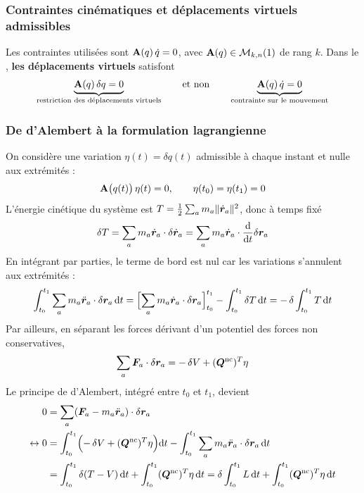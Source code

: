 \subsubsection{Contraintes cinématiques et déplacements virtuels admissibles}

Les contraintes utilisées sont $\mathbf{A}(q)\,\dot q = 0$, avec
$\mathbf{A}(q)\in\mathcal{M}_{k,n}(1)$ de rang $k$. Dans le , \textbf{les déplacements virtuels} satisfont
\[
    \underbrace{\mathbf{A}(q)\,\delta q = 0}
    _{\text{restriction des déplacements virtuels}}
    \qquad\text{et non}\qquad
    \underbrace{\mathbf{A}(q)\,\dot q = 0}
    _{\text{contrainte sur le mouvement}}
\]

\subsubsection{De d'Alembert à la formulation lagrangienne}

On considère une variation $\eta(t) = \delta q(t)$ admissible à chaque
instant et nulle aux extrémités :
\[
    \mathbf{A}\bigl(q(t)\bigr)\,\eta(t) = 0,
    \qquad \eta(t_0) = \eta(t_1) = 0
\]
L'énergie cinétique du système est $T = \frac12\sum_a m_a
\|\dot{\bm{r}}_a\|^2$, donc à temps fixé
\[
    \delta T = \sum_a m_a\dot{\bm{r}}_a\cdot\delta\dot{\bm{r}}_a
    = \sum_a m_a\dot{\bm{r}}_a\cdot\frac{\mathrm{d}}{\mathrm{d} t}\delta\bm{r}_a
\]
En intégrant par parties, le terme de bord est nul car les variations
s'annulent aux extrémités :
\[
    \int_{t_0}^{t_1}\sum_a m_a\ddot{\bm{r}}_a\cdot\delta\bm{r}_a
    \,\mathrm{d} t
    = \Bigl[\sum_a m_a\dot{\bm{r}}_a\cdot\delta\bm{r}_a
    \Bigr]_{t_0}^{t_1}
    - \int_{t_0}^{t_1}\delta T\,\mathrm{d} t
    = -\,\delta\int_{t_0}^{t_1}T\,\mathrm{d} t
\]
Par ailleurs, en séparant les forces dérivant d'un potentiel des
forces non conservatives,
\[
    \sum_a\bm{F}_a\cdot\delta\bm{r}_a
    = -\,\delta V + (\bm{Q}^{\mathrm{nc}})^T\eta
\]
Le principe de d'Alembert, intégré entre $t_0$ et $t_1$, devient
\begin{align*}
    0 &= \sum_a (\bm{F}_a - m_a \ddot{\bm{r}}_a) \cdot \delta \bm{r}_a \\
    \leftrightarrow 0 &= \int_{t_0}^{t_1}\Bigl(-\,\delta V
    + (\bm{Q}^{\mathrm{nc}})^T\eta\Bigr)\mathrm{d} t
    - \int_{t_0}^{t_1}\sum_a m_a\ddot{\bm{r}}_a\cdot
    \delta\bm{r}_a\,\mathrm{d} t\\
    &= \int_{t_0}^{t_1}\delta(T - V)\,\mathrm{d} t
    + \int_{t_0}^{t_1}(\bm{Q}^{\mathrm{nc}})^T\eta\,\mathrm{d} t
    = \delta\int_{t_0}^{t_1}L\,\mathrm{d} t
    + \int_{t_0}^{t_1}(\bm{Q}^{\mathrm{nc}})^T\eta\,\mathrm{d} t
\end{align*}

